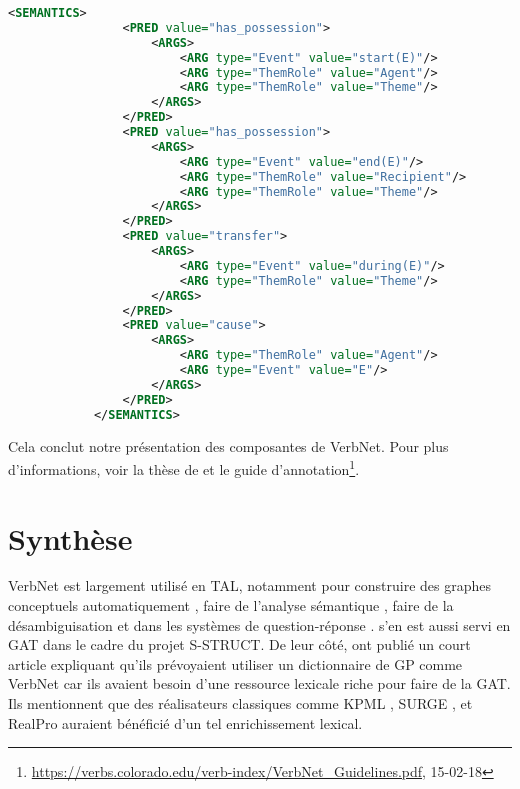 \begin{lstlisting}[language=Xml, caption=Les prédicats sémantiques, label=cadresem]
<SEMANTICS>
                <PRED value="has_possession">
                    <ARGS>
                        <ARG type="Event" value="start(E)"/>
                        <ARG type="ThemRole" value="Agent"/>
                        <ARG type="ThemRole" value="Theme"/>
                    </ARGS>
                </PRED>
                <PRED value="has_possession">
                    <ARGS>
                        <ARG type="Event" value="end(E)"/>
                        <ARG type="ThemRole" value="Recipient"/>
                        <ARG type="ThemRole" value="Theme"/>
                    </ARGS>
                </PRED>
                <PRED value="transfer">
                    <ARGS>
                        <ARG type="Event" value="during(E)"/>
                        <ARG type="ThemRole" value="Theme"/>
                    </ARGS>
                </PRED>
                <PRED value="cause">
                    <ARGS>
                        <ARG type="ThemRole" value="Agent"/>
                        <ARG type="Event" value="E"/>
                    </ARGS>
                </PRED>
            </SEMANTICS>
\end{lstlisting}

Cela conclut notre présentation des composantes de VerbNet. Pour plus d'informations, voir la thèse de \cite{SchulerVerbnetBroadcoverageComprehensive2005} et le guide d'annotation\footnote{\url{https://verbs.colorado.edu/verb-index/VerbNet_Guidelines.pdf}, 15-02-18}.



\section{Synthèse}

VerbNet est largement utilisé en \ac{TAL}, notamment pour construire des graphes conceptuels automatiquement \citep{HensmanAutomaticallyBuildingConceptual2004}, faire de l'analyse sémantique \citep{Shi:2005:PPT:2132047.2132058}, faire de la désambiguisation \citep{AbendSupervisedAlgorithmVerb2008} et dans les systèmes de question-réponse \citep{DBLP:conf/nlpke/WenJH08}. \citep{PfeilAlgorithmsResourcesScalable2016} s'en est aussi servi en \ac{GAT} dans le cadre du projet S-STRUCT. De leur côté, \cite{MilleLargeCoverageDetailed2015} ont publié un court article expliquant qu'ils prévoyaient utiliser un dictionnaire de \ac{GP} comme VerbNet car ils avaient besoin d'une ressource lexicale riche pour faire de la \ac{GAT}. Ils mentionnent que des réalisateurs classiques comme KPML \citep{BatemanEnablingTechnologyMultilingual1997}, SURGE \citep{Elhadad98surge:a}, et RealPro \citep{LavoieFastPortableRealizer1997} auraient bénéficié d'un tel enrichissement lexical.

